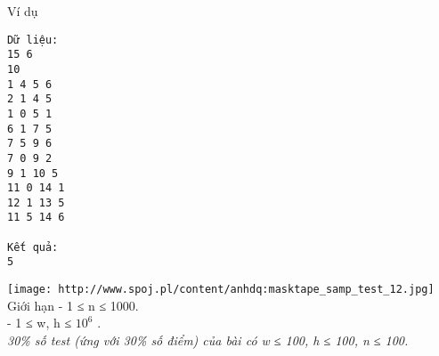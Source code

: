 Ví dụ
\begin{verbatim}
Dữ liệu:
15 6
10
1 4 5 6
2 1 4 5
1 0 5 1
6 1 7 5
7 5 9 6
7 0 9 2
9 1 10 5
11 0 14 1
12 1 13 5
11 5 14 6

Kết quả:
5
\end{verbatim}
\texttt{[image: http://www.spoj.pl/content/anhdq:masktape\_samp\_test\_12.jpg]}
Giới hạn
- 1 ≤ n ≤ 1000.   
\\   - 1 ≤ w, h ≤ $10^{6}$   .   
\\\textit{     30\% số test (ứng với 30\% số điểm) của bài có  w ≤ 100, h ≤ 100, n ≤ 100.    }